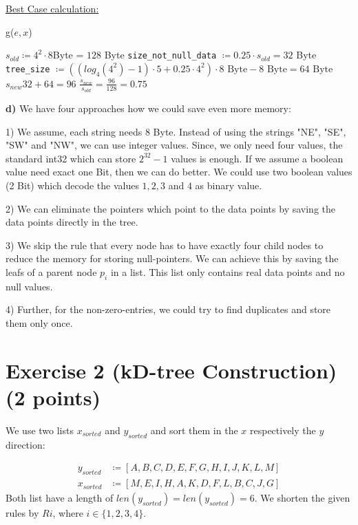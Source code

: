 \documentclass[english, fontsize=12pt, paper=a4, twoside=false, draft=true, pagesize=auto, version=last, DIV=16]{scrartcl}
\theoremstyle{break}
\begin{document}
\underline{Best Case calculation:} \par
\vspace*{-3mm}
\begin{algorithm}
{g($e, x$)} \par
\begin{algorithmic}[1]
	\State $s_{old} \coloneqq 4^2 \cdot 8$Byte = $128$ Byte
	\State \texttt{size\_not\_null\_data} $\coloneqq 0.25 \cdot s_{old} = 32$ Byte
	\State \texttt{tree\_size} $\coloneqq \left( (log_4(4^2) - 1) \cdot 5 + 0.25 \cdot 4^2 \right) \cdot 8 \text{ Byte} - 8 \text{ Byte} = 64 \text{ Byte}$
	\State $s_{new} 32 + 64= 96$ 
   	\State \Return $\frac{s_{new}}{s_{old}} = \frac{96}{128} = 0.75$
\end{algorithmic}
\end{algorithm}\par
\vspace*{15mm}


\textbf{d)}
We have four approaches how we could save even more memory:

1) We assume, each string needs 8 Byte. Instead of using the strings "NE", "SE", "SW" and "NW", we can use integer values. Since, we only need four values, the standard int32 which can store $2^{32}-1$ values is enough. If we assume a boolean value need exact one Bit, then we can do better. We could use two boolean values (2 Bit) which decode the values $1,2,3$ and $4$ as binary value. \par
2) We can eliminate the pointers which point to the data points by saving the data points directly in the tree. \par
3) We skip the rule that every node has to have exactly four child nodes to reduce the memory for storing null-pointers. We can achieve this by saving the leafs of a parent node $p_i$ in a list. This list only contains real data points and no null values. \par
4) Further, for the non-zero-entries, we could try to find duplicates and store them only once. \par
\newpage




\section*{\large Exercise 2 (kD-tree Construction) {\normalsize \hfill (2 points)}}
\vspace*{10mm}
We use two lists $x_{sorted}$ and $y_{sorted}$ and sort them in the $x$ respectively the $y$ direction: \par
\begin{equation}
\begin{aligned}
y_{sorted} & \coloneqq [A,B,C,D,E,F,G,H,I,J,K,L,M] \\[3pt]
x_{sorted} & \coloneqq [M,E,I,H,A,K,D,F,L,B,C,J,G]
\end{aligned}
\end{equation}
Both list have a length of $len(y_{sorted}) = len(y_{sorted}) = 6$. We shorten the given rules by $Ri$, where $i \in \{1,2,3,4\}$. \par
\vspace*{15mm}
\end{document}
